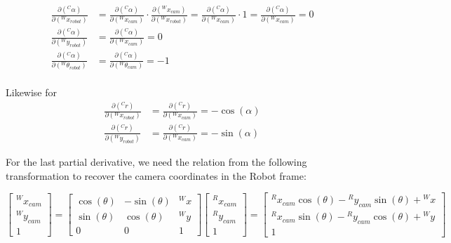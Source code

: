 \documentclass{article}
\begin{document}
\begin{enumerate}[label=(\roman*)]
\begin{equation}
\begin{aligned}
\frac{\partial ({}^C\alpha)}{\partial ({}^W x_{robot})}
&= \frac{\partial ({}^C\alpha)}{\partial ({}^W x_{cam})} \cdot
\frac{\partial ({}^W x_{cam})}{\partial ({}^W x_{robot})}
=\frac{\partial ({}^C\alpha)}{\partial ({}^W x_{cam})} \cdot 1
=
\frac{\partial ({}^C\alpha)}{\partial ({}^W x_{cam})} = 0 \\
\frac{\partial ({}^C\alpha)}{\partial ({}^W y_{robot})} &= \frac{\partial ({}^C\alpha)}{\partial ({}^W x_{cam})} = 0 \\
\frac{\partial ({}^C\alpha)}{\partial ({}^W \theta_{robot})} &= \frac{\partial ({}^C\alpha)}{\partial ({}^W \theta_{cam})} = -1 \\
\end{aligned}
\end{equation}

Likewise for 
\begin{equation}
\begin{aligned}
\frac{\partial ({}^C r)}{\partial ({}^W x_{robot})} &= \frac{\partial ({}^C r)}{\partial ({}^W x_{cam})} = -\cos(\alpha) \\
\frac{\partial ({}^C r)}{\partial ({}^W y_{robot})} &= \frac{\partial ({}^C r)}{\partial ({}^W x_{cam})} = -\sin(\alpha)
\end{aligned}
\end{equation}

For the last partial derivative, we need the relation from the following transformation to recover the camera coordinates in the Robot frame:

\begin{equation}
\begin{bmatrix}
{}^W x_{cam} \\ {}^W y_{cam} \\ 1
\end{bmatrix}
=
\begin{bmatrix}
\cos(\theta) & -\sin(\theta) & {}^W x \\
\sin(\theta) & \cos(\theta) & {}^W y \\
0 & 0 & 1
\end{bmatrix}
\begin{bmatrix}
{}^R x_{cam} \\ {}^R y_{cam} \\ 1
\end{bmatrix}
=
\begin{bmatrix}
{}^R x_{cam} \cos(\theta) - {}^R y_{cam} \sin(\theta) + {}^W x \\
{}^R x_{cam} \sin(\theta) - {}^R y_{cam} \cos(\theta) + {}^W y \\
1
\end{bmatrix}
\end{equation}


\end{enumerate}
\end{document}
